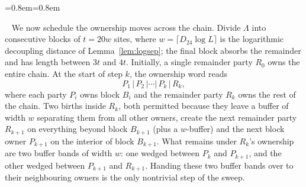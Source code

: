 \documentclass[aps,prx,reprint,superscriptaddress,floatfix,nofootinbib,longbibliography,amsmath,amssymb]{revtex4-2}
\newcommand{\Lam}{\Lambda}
\theoremstyle{plain}
\theoremstyle{definition}
\newenvironment{inwords}{%
  \par\medskip\noindent
  \begin{list}{}{\leftmargin=0.8em\rightmargin=0.8em}
  \item\relax
  \noindent{\sffamily\bfseries\color{blue!40!black}In words.}\ \sffamily\small}{%
  \end{list}\par\medskip}
\begin{document}
\begin{inwords}
We now schedule the ownership moves across the chain. Divide $\Lam$ into
consecutive blocks of $t=20w$ sites, where $w=\lceil D_{24}\log L\rceil$ is
the logarithmic decoupling distance of Lemma~\ref{lem:logsep}; the final
block absorbs the remainder and has length between $3t$ and $4t$. Initially,
a single remainder party $R_0$ owns the entire chain. At the start of step $k$,
the ownership word reads
\[
 P_1\,|\,P_2\,|\cdots|\,P_k\,|\,R_k ,
\]
where each party $P_i$ owns block $B_i$ and the remainder party $R_k$ owns
the rest of the chain. Two births inside $R_k$, both permitted because they
leave a buffer of width $w$ separating them from all other owners, create
the next remainder party $R_{k+1}$ on everything beyond block $B_{k+1}$
(plus a $w$-buffer) and the next block owner $P_{k+1}$ on the interior of
block $B_{k+1}$. What remains under $R_k$'s ownership are two buffer bands of
width $w$: one wedged between $P_k$ and $P_{k+1}$, and the other wedged
between $P_{k+1}$ and $R_{k+1}$. Handing these two buffer bands over to
their neighbouring owners is the only nontrivial step of the sweep.


\end{inwords}
\end{document}

